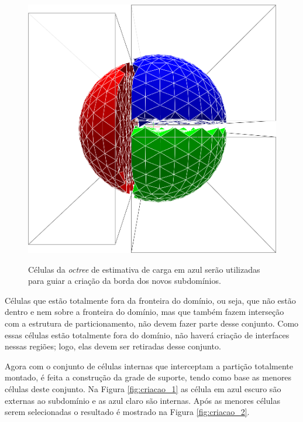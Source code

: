 \begin{figure}[!ht]
{		\begin{minipage}[c]{0.45\textwidth}{\includegraphics[width=\textwidth]{fig/esfera3.png}}\end{minipage}
	}
	\caption{Células da \textit{octree} de estimativa de carga em azul serão utilizadas para guiar a criação da borda dos novos subdomínios.}
	\label{fig:celulas_selecionadas3d}
\end{figure}


Células que estão totalmente fora da fronteira do domínio, ou seja, que não estão dentro e nem sobre a fronteira do domínio, mas que também fazem interseção com a estrutura de particionamento, não devem fazer parte desse conjunto. Como essas células estão totalmente fora do domínio, não haverá criação de interfaces nessas regiões; logo, elas devem ser retiradas desse conjunto.

Agora com o conjunto de células internas que interceptam a partição totalmente montado, é feita a construção da grade de suporte, tendo como base as menores células deste conjunto. Na Figura \ref{fig:criacao_1} as célula em azul escuro são externas ao subdomínio e as azul claro são internas. Após as menores células serem selecionadas o resultado é mostrado na Figura \ref{fig:criacao_2}.


